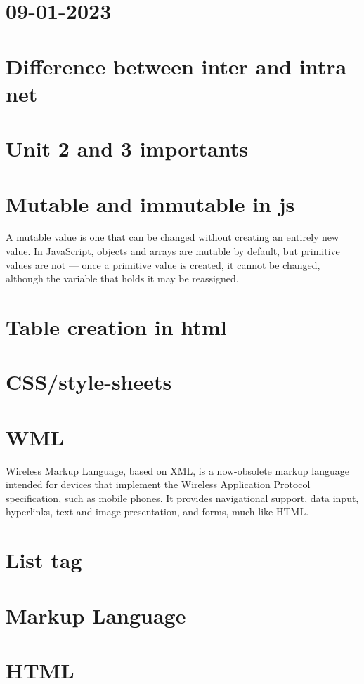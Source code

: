 \documentclass{article}
\begin{document}
\section*{09-01-2023}
\section{Difference between inter and intra net}

\section{Unit 2 and 3 importants}

\section{Mutable and immutable in js}
A mutable value is one that can be changed without creating an entirely new value. In JavaScript, objects and arrays are mutable by default, but primitive values are not — once a primitive value is created, it cannot be changed, although the variable that holds it may be reassigned.

\section{Table creation in html}
\section{CSS/style-sheets}
\section{WML}
Wireless Markup Language, based on XML, is a now-obsolete markup language intended for devices that implement the Wireless Application Protocol specification, such as mobile phones. It provides navigational support, data input, hyperlinks, text and image presentation, and forms, much like HTML.

\section{List tag}

\section{Markup Language}
\section{HTML}
\end{document}
